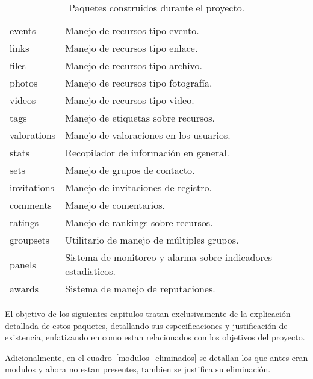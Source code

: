 \begin{table}
\begin{tabular}{l|l}
events & Manejo de recursos tipo evento. \\
links & Manejo de recursos tipo enlace. \\
files & Manejo de recursos tipo archivo. \\
photos & Manejo de recursos tipo fotografía. \\
videos & Manejo de recursos tipo video. \\
tags & Manejo de etiquetas sobre recursos. \\
valorations & Manejo de valoraciones en los usuarios. \\
stats & Recopilador de información en general. \\
\hline
sets & Manejo de grupos de contacto. \\
invitations & Manejo de invitaciones de registro. \\
comments & Manejo de comentarios. \\
ratings & Manejo de rankings sobre recursos. \\
groupsets & Utilitario de manejo de múltiples grupos. \\
panels & Sistema de monitoreo y alarma sobre indicadores estadisticos. \\
awards & Sistema de manejo de reputaciones.
\end{tabular}
\caption{Paquetes construidos durante el proyecto.}
\label{modulos_actuales}
\end{table}

El objetivo de los siguientes capitulos tratan exclusivamente de la explicación detallada de estos paquetes, detallando
sus especificaciones y justificación de existencia, enfatizando en como estan relacionados con los objetivos del
proyecto.

Adicionalmente, en el cuadro~\ref{modulos_eliminados} se detallan los que antes eran modulos y ahora no estan presentes,
tambien se justifica su eliminación.

